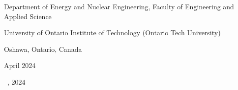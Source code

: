 \begin{titlepage}
\begin{center}
\bigskip
\bigskip
\bigskip
\bigskip

Department of Energy and Nuclear Engineering, Faculty of Engineering and Applied Science

\medskip

University of Ontario Institute of Technology (Ontario Tech University)

\medskip

Oshawa, Ontario, Canada

\medskip

April 2024

\vfill


\bigskip
\textcopyright{} \makeatletter \@firstname\ {\@lastname}\makeatother, 2024



\vspace*{2\bigskipamount}

\end{center}

\end{titlepage}

